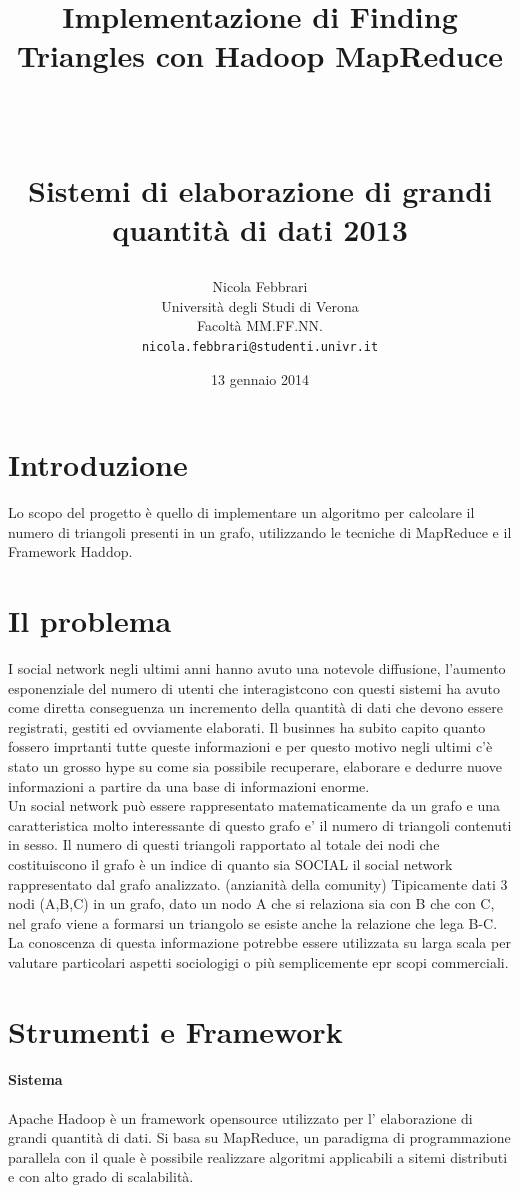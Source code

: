 \documentclass[paper=a4, fontsize=11pt]{scrartcl}	%
\title{ \vspace{-1in} 	\usefont{OT1}{bch}{b}{n}
		\huge \strut Implementazione di Finding Triangles con Hadoop MapReduce\strut \\
		\Large \bfseries \strut Sistemi di elaborazione di grandi quantità di dati 2013 \strut
}
\author{ 									\usefont{OT1}{bch}{m}{n}
        Nicola Febbrari\\		\usefont{OT1}{bch}{m}{n}
        Università degli Studi di Verona\\	\usefont{OT1}{bch}{m}{n}
        Facoltà MM.FF.NN.\\
        \texttt{nicola.febbrari@studenti.univr.it}
}
\date{13 gennaio 2014}
\numberwithin{equation}{section}															%
\numberwithin{figure}{section}																%
\numberwithin{table}{section}																%
\begin{document}
\maketitle
\section{Introduzione}
Lo scopo del progetto è quello di implementare un algoritmo per calcolare il numero di triangoli presenti in un grafo, utilizzando le tecniche di MapReduce e il Framework Haddop.


\section{Il problema}
I social network negli ultimi anni hanno avuto una notevole diffusione, l'aumento esponenziale del numero di utenti che interagistcono con questi sistemi 
ha avuto come diretta conseguenza un  incremento della quantità di dati che devono essere registrati, gestiti ed ovviamente elaborati.
Il businnes ha subito capito quanto fossero imprtanti tutte queste informazioni e per questo motivo negli ultimi c'è stato un grosso hype su come sia 
possibile recuperare, elaborare e dedurre nuove informazioni a partire da una base di informazioni enorme.\\

Un social network può essere rappresentato matematicamente da un grafo e una caratteristica molto interessante di questo grafo e' il numero di triangoli contenuti in sesso. 
Il numero di questi triangoli rapportato al totale dei nodi che costituiscono il grafo è un indice di quanto sia SOCIAL il social network rappresentato dal grafo analizzato. (anzianità della comunity)
Tipicamente dati 3 nodi (A,B,C) in un grafo, dato un nodo  A che si relaziona sia con B che con C, nel grafo viene a formarsi un triangolo se esiste anche la relazione che lega B-C.
La conoscenza di questa informazione potrebbe essere utilizzata su larga scala per valutare particolari aspetti sociologigi o più semplicemente epr scopi commerciali.\\

\section{Strumenti e Framework}
\paragraph{Sistema}
Apache Hadoop è un framework opensource utilizzato per l' elaborazione di grandi quantità di dati. 
Si basa su MapReduce, un paradigma di programmazione parallela con il quale è possibile realizzare algoritmi applicabili a sitemi distributi e con alto grado di scalabilità.
\end{document}
